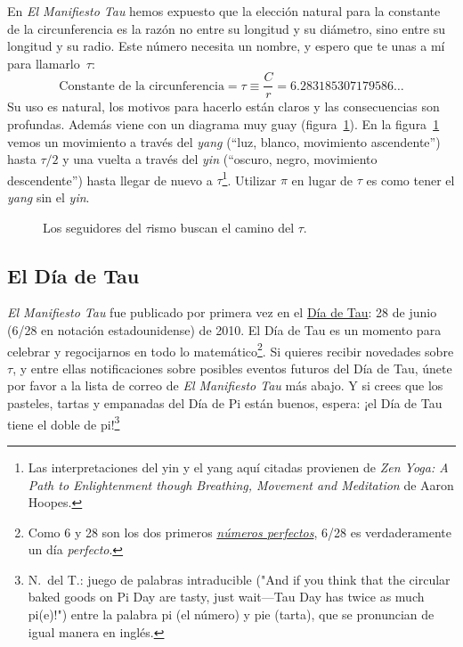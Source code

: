 En \emph{El Manifiesto Tau} hemos expuesto que la elección natural para la constante de la circunferencia es la razón no entre su longitud y su diámetro, sino entre su longitud y su radio. Este número necesita un nombre, y espero que te unas a mí para llamarlo~$\tau$:
\[
  \mbox{Constante de la circunferencia} = \tau \equiv \frac{C}{r} = 6.283185307179586\ldots
\]
Su uso es natural, los motivos para hacerlo están claros y las consecuencias son profundas. Además viene con un diagrama muy guay (figura~\ref{fig:tauism}). En la figura~\ref{fig:tauism} vemos un movimiento a través del \emph{yang} (``luz, blanco, movimiento ascendente'') hasta $\tau/2$ y una vuelta a través del \emph{yin} (``oscuro, negro, movimiento descendente'') hasta llegar de nuevo a $\tau$\footnote{Las interpretaciones del yin y el yang aquí citadas provienen de \emph{Zen Yoga: A Path to Enlightenment though Breathing, Movement and Meditation} de Aaron Hoopes.}. Utilizar $\pi$ en lugar de $\tau$ es como tener el \emph{yang} sin el \emph{yin}.

\begin{figure}
\begin{center}
\end{center}
\caption{Los seguidores del $\tau$ismo buscan el camino del $\tau$.\label{fig:tauism}}
\end{figure}



  \subsection{El Día de Tau} %
  \label{sec:tau_day}

\emph{El Manifiesto Tau} fue publicado por primera vez en el \href{http://tauday.com/}{Día de Tau}: 28 de junio (6/28 en notación estadounidense) de 2010. El Día de Tau es un momento para celebrar y regocijarnos en todo lo matemático\footnote{Como 6 y 28 son los dos primeros \href{https://es.wikipedia.org/wiki/Número_perfecto}{\emph{números perfectos}}, 6/28 es verdaderamente un día \emph{perfecto}.}. Si quieres recibir novedades sobre $\tau$, y entre ellas notificaciones sobre posibles eventos futuros del Día de Tau, únete por favor a la lista de correo de \emph{El Manifiesto Tau} más abajo. Y si crees que los pasteles, tartas y empanadas del Día de Pi están buenos, espera: ¡el Día de Tau tiene el doble de pi!\footnote{N.~del T.: juego de palabras intraducible ("And if you think that the circular baked goods on Pi Day are tasty, just wait—Tau Day has twice as much pi(e)!") entre la palabra pi (el número) y pie (tarta), que se pronuncian de igual manera en inglés.}


